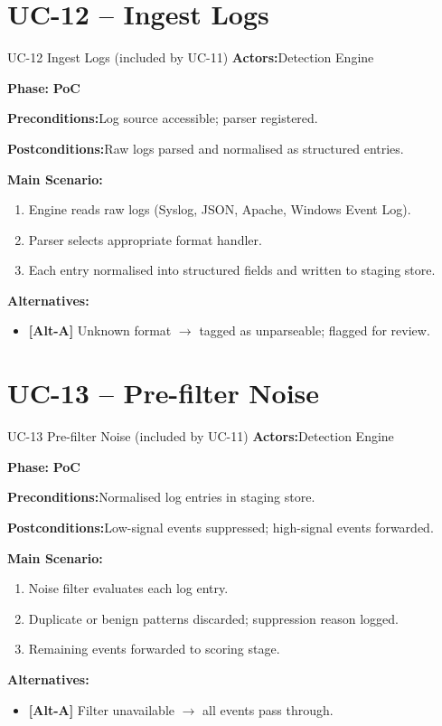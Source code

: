 \documentclass[12pt,a4paper]{report}
\newcommand{\ucfield}[2]{%
    \noindent\textbf{\color{helixpurplemid}#1:}\quad #2\par\medskip
}
\newcommand{\ucphase}[1]{%
    \noindent\textbf{\color{helixpurplemid}Phase:}\quad%
    \ifstrequal{#1}{PoC}{\textcolor{helixteal}{\textbf{PoC}}}{\textcolor{helixamber}{\textbf{Future MVP}}}%
    \par\medskip
}
\begin{document}
\section{UC-12 -- Ingest Logs}
\begin{ucbox}{UC-12 \quad Ingest Logs \textnormal{(included by UC-11)}}
    \ucfield{Actors}{Detection Engine}
    \ucphase{PoC}
    \ucfield{Preconditions}{Log source accessible; parser registered.}
    \ucfield{Postconditions}{Raw logs parsed and normalised as structured entries.}
    \textbf{\color{helixpurplemid}Main Scenario:}
    \begin{enumerate}
        \item Engine reads raw logs (Syslog, JSON, Apache, Windows Event Log).
        \item Parser selects appropriate format handler.
        \item Each entry normalised into structured fields and written to staging store.
    \end{enumerate}
    \textbf{\color{helixpurplemid}Alternatives:}
    \begin{itemize}
        \item \textbf{[Alt-A]} Unknown format $\rightarrow$ tagged as unparseable; flagged for review.
    \end{itemize}
\end{ucbox}

\section{UC-13 -- Pre-filter Noise}
\begin{ucbox}{UC-13 \quad Pre-filter Noise \textnormal{(included by UC-11)}}
    \ucfield{Actors}{Detection Engine}
    \ucphase{PoC}
    \ucfield{Preconditions}{Normalised log entries in staging store.}
    \ucfield{Postconditions}{Low-signal events suppressed; high-signal events forwarded.}
    \textbf{\color{helixpurplemid}Main Scenario:}
    \begin{enumerate}
        \item Noise filter evaluates each log entry.
        \item Duplicate or benign patterns discarded; suppression reason logged.
        \item Remaining events forwarded to scoring stage.
    \end{enumerate}
    \textbf{\color{helixpurplemid}Alternatives:}
    \begin{itemize}
        \item \textbf{[Alt-A]} Filter unavailable $\rightarrow$ all events pass through.
    \end{itemize}
\end{ucbox}
\end{document}
